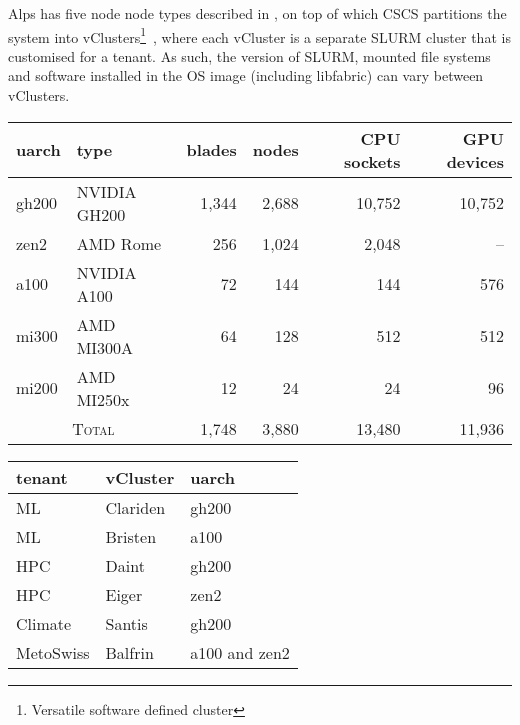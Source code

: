 Alps has five node node types described in , on top of which CSCS partitions the system into vClusters\footnote{Versatile software defined cluster}~\cite{vClusters2023}, where each vCluster is a separate SLURM cluster that is customised for a tenant.
As such, the version of SLURM, mounted file systems and software installed in the OS image (including libfabric) can vary between vClusters.

\begin{table*}[!htb]
    \begin{minipage}{0.6\textwidth}
        \centering
        \begin{tabular}{llrrrr}
        \toprule
        uarch   & type         & blades & nodes & CPU sockets & GPU devices \\
        \midrule
        gh200   & NVIDIA GH200 & 1,344   & 2,688  & 10,752      & 10,752      \\
        zen2    & AMD Rome     & 256     & 1,024  & 2,048       & --          \\
        a100    & NVIDIA A100  & 72      & 144    & 144         & 576         \\
        mi300   & AMD MI300A   & 64      & 128    & 512         & 512         \\
        mi200   & AMD MI250x   & 12      & 24     & 24          & 96          \\
        \midrule
        \multicolumn{2}{c}{\textsc{Total}}      & 1,748   & 3,880  & 13,480  & 11,936 \\
        \bottomrule
        \end{tabular}
    \end{minipage}%
    \begin{minipage}{0.4\textwidth}
        \centering
        \begin{tabular}{lll}
        \toprule
        tenant   & vCluster & uarch         \\
        \midrule
            ML      & Clariden & gh200 \\
            ML      & Bristen  & a100 \\
            HPC     & Daint    & gh200 \\
            HPC     & Eiger    & zen2 \\
            Climate & Santis   & gh200  \\
            MetoSwiss & Balfrin   & a100 and zen2  \\
        \bottomrule
        \end{tabular}
    \end{minipage}
    \caption{Alps node types and their specifications (left), and examples of vClusters provided to tenants (right).}
\label{tab:alps-nodes}
\end{table*}

